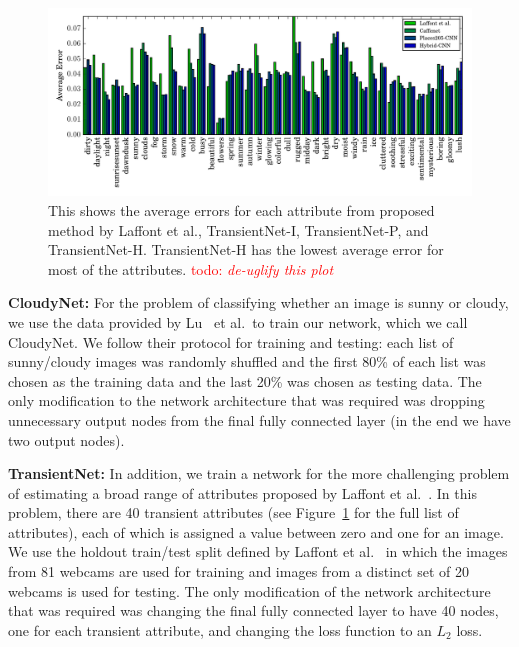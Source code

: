 \documentclass[10pt,twocolumn,letterpaper]{article}
\newcommand{\todo}[1]{\textcolor{red}{todo: {\em #1}}}
\newcommand{\figref}[1]{Figure~\ref{fig:#1}}
\begin{document}
\begin{figure}[t!]
	\centering
		\includegraphics[width=1.0\textwidth, trim= 0 4mm 0 0]{figs/avg_err_compare.pdf}
		\caption{This shows the average errors for each attribute from proposed method
						 by Laffont et al., TransientNet-I, TransientNet-P, and TransientNet-H.  
             TransientNet-H has the lowest average error for most of the attributes.
             \todo{de-uglify this plot}}
		\label{fig:compare}
\end{figure}

\textbf{CloudyNet:} For the problem of classifying whether an image is sunny or
cloudy, we use the data provided by Lu~\cite{lutwoclass} et al.\ to train our
network, which we call CloudyNet.  We follow their protocol for training and
testing: each list of sunny/cloudy images was randomly shuffled and the first
80\% of each list was chosen as the training data and the last 20\% was chosen
as testing data.  The only modification to the network architecture that was
required was dropping unnecessary output nodes from the final fully connected
layer (in the end we have two output nodes).

\textbf{TransientNet:} In addition, we train a network for the more challenging
problem of estimating a broad range of attributes proposed by
Laffont et al.~\cite{Laffont14}.  In this problem, there are 40 transient attributes
(see \figref{compare} for the full list of attributes), each of which is
assigned a value between zero and one for an image. We use the holdout
train/test split defined by Laffont et al.~\cite{Laffont14} in which the images
from 81 webcams are used for training and images from a distinct set of 20
webcams is used for testing.  The only modification of the network architecture
that was required was changing the final fully connected layer to have 40
nodes, one for each transient attribute, and changing the loss function to an
$L_2$ loss. 
\end{document}
